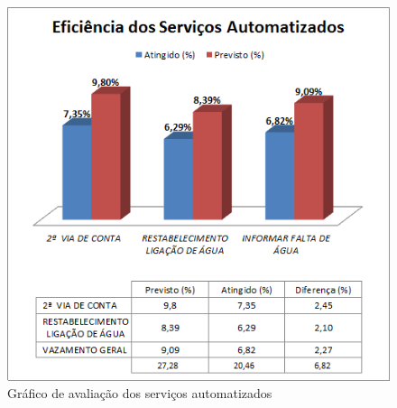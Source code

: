 \begin{figure}[!htb]
	\centering
	\caption{Gráfico de avaliação dos serviços automatizados}
	\label{figura:eficienciaServicos}	
	\includegraphics{figuras/eficiencia_servicos.png}
\end{figure}

